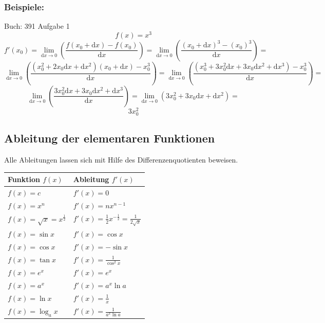 \documentclass[11pt]{amsart}
\theoremstyle{remark}
\begin{document}
\subsubsection*{Beispiele:}
Buch: 391\newline
Aufgabe 1
\begin{equation}
f(x)=x^3
\end{equation}
\begin{equation*}
	f'(x_0) = \lim_{\mathrm dx \to 0} \left( \frac {f(x_0 + \mathrm dx) - f(x_0)}{\mathrm dx} \right) =  
	\lim_{\mathrm dx \to 0} \left( \frac {(x_0 + \mathrm dx)^3 - (x_0)^3}{\mathrm dx} \right) =
\end{equation*}
\begin{equation*}
	\lim_{\mathrm dx \to 0} \left( \frac {(x_0^2 + 2x_0\mathrm dx + \mathrm dx^2)(x_0 + \mathrm dx) - x_0^3}{\mathrm dx} \right) =  
	\lim_{\mathrm dx \to 0} \left( \frac {(x_0^3 + 3x_0^2\mathrm dx + 3x_0\mathrm dx^2 + \mathrm dx^3) - x_0^3}{\mathrm dx} \right) =  
\end{equation*}
\begin{equation*}
	\lim_{\mathrm dx \to 0} \left( \frac { 3x_0^2\mathrm dx + 3x_0\mathrm dx^2 + \mathrm dx^3}{\mathrm dx} \right) =  
	\lim_{\mathrm dx \to 0} \left(  3x_0^2 + 3x_0\mathrm dx + \mathrm dx^2 \right) =  
\end{equation*}
\begin{equation*}
	3x_0^2 
\end{equation*}

\subsection{Ableitung der elementaren Funktionen}
Alle Ableitungen lassen sich mit Hilfe des Differenzenquotienten beweisen.
\begin{table}[h]
\begin{center}
\begin{tabular}[t]{l|l}
Funktion $f(x)$ & Ableitung $f'(x)$ \\
\hline
$f(x)=c$ & $f'(x)=0$  \\
$f(x)=x^n$ & $f'(x)=nx^{n-1}$ \\
$f(x)=\sqrt{x}=x^{\frac 12}$ & $f'(x)=\frac 12x^{-\frac 12}= \frac {1}{2\sqrt {x}}$ \\
$f(x)=\sin {x}$ & $f'(x)=\cos {x}$ \\
$f(x)=\cos {x}$ & $f'(x)=-\sin {x}$ \\
$f(x)=\tan {x}$ & $f'(x)=\frac {1}{\cos^2 {x}}$ \\
$f(x)=e^x$ & $f'(x)=e^x$ \\
$f(x)=a^x$ & $f'(x)=a^x\ln {a}$ \\
$f(x)=\ln x$ & $f'(x)= \frac 1x$ \\
$f(x)=\log_a {x}$ & $f'(x)=\frac {1}{a^x\ln {a}}$ \\
\end{tabular}
\end{center}
\label{default}
\end{table}
\end{document}
